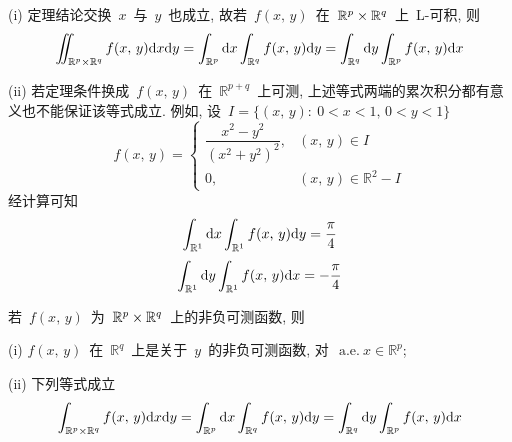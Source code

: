 \begin{remark}
(i) 定理结论交换~$x$~与~$y$~也成立, 故若~$f(x,\, y)$~在~$\mathbb{R}^p \times \mathbb{R}^q$~上~L-可积, 则
 \[
 \iint_{\mathbb{R}^p \times \mathbb{R}^q}f(x,\,y) \mathrm{d} x \mathrm{d} y=\int_{\mathbb{R}^{p}}\mathrm{d} x\int_{\mathbb{R}^{q}}f(x,\, y)\mathrm{d} y = \int_{\mathbb{R}^{q}}\mathrm{d} y \int_{\mathbb{R}^{p}}f(x,\, y)\mathrm{d} x
 \]

(ii) 若定理条件换成~$f(x,\, y)$~在~$\mathbb{R}^{p+q}$~上可测, 上述等式两端的累次积分都有意义也不能保证该等式成立. 例如,
设~$I=\{(x,\, y):\: 0<x<1,\, 0<y<1\}$
\[
f(x,\,y)=\left\{\!\!
\begin{array}{cl}
\dfrac{x^{2}-y^{2}}{(x^{2}+y^{2})^{2}}, & (x,\, y)\in I \\[0.3cm]
0,  & (x,\, y)\in \mathbb{R}^{2} - I
\end{array}
\right.
\]
经计算可知
\[
\int_{\mathbb{R}^{1}}\mathrm{d} x\int_{\mathbb{R}^{1}}f(x,\, y)\mathrm{d} y=\frac{\mathrm{\pi}}{4}
\]
\[
\int_{\mathbb{R}^{1}}\mathrm{d} y\int_{\mathbb{R}^{1}}f(x,\, y)\mathrm{d} x=-\frac{\mathrm{\pi}}{4}
\]
\end{remark}

\begin{corollary}\label{cor-5-2}
若~$f(x,\,y)$~为~$\mathbb{R}^p \times \mathbb{R}^q$~上的非负可测函数, 则

(i) $f(x,\, y)$~在~$\mathbb{R}^{q}$~上是关于~$y$~的非负可测函数, 对~$\mathrm{~a.e.~} x \in \mathbb{R}^{p}$;

(ii) 下列等式成立
\[
\int_{\mathbb{R}^p \times \mathbb{R}^q}f(x,\, y)\mathrm{d} x \mathrm{d} y = \int_{\mathbb{R}^{p}}\mathrm{d} x \int_{\mathbb{R}^{q}}f(x,\,  y)\mathrm{d} y =\int_{\mathbb{R}^{q}}\mathrm{d} y \int_{\mathbb{R}^{p}}f(x,\, y)\mathrm{d} x
\]
\end{corollary}

